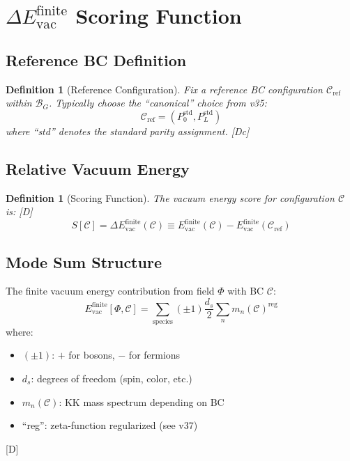 \documentclass[11pt,a4paper]{article}
\newtheorem{definition}[theorem]{Definition}
\newcommand{\tagD}{\textcolor{blue!70!black}{[D]}}
\newcommand{\tagDc}{\textcolor{blue!50!black}{[Dc]}}
\begin{document}
\section{$\Delta E_{\text{vac}}^{\text{finite}}$ Scoring Function}

\subsection{Reference BC Definition}

\begin{definition}[Reference Configuration]
\label{def:bc-ref}
Fix a reference BC configuration $\mathcal{C}_{\text{ref}}$ within $\mathcal{B}_G$.
Typically choose the ``canonical'' choice from v35:
\begin{equation}
\label{eq:bc-ref}
\mathcal{C}_{\text{ref}} = (P_0^{\text{std}}, P_L^{\text{std}})
\end{equation}
where ``std'' denotes the standard parity assignment. \tagDc
\end{definition}

\subsection{Relative Vacuum Energy}

\begin{definition}[Scoring Function]
\label{def:score}
The vacuum energy score for configuration $\mathcal{C}$ is: \tagD
\begin{equation}
\label{eq:score}
\boxed{S[\mathcal{C}] = \Delta E_{\text{vac}}^{\text{finite}}(\mathcal{C})
\equiv E_{\text{vac}}^{\text{finite}}(\mathcal{C}) - E_{\text{vac}}^{\text{finite}}(\mathcal{C}_{\text{ref}})}
\end{equation}
\end{definition}

\subsection{Mode Sum Structure}

\begin{scorebox}
The finite vacuum energy contribution from field $\Phi$ with BC $\mathcal{C}$:
\begin{equation}
\label{eq:mode-sum}
E_{\text{vac}}^{\text{finite}}[\Phi, \mathcal{C}] = \sum_{\text{species}} (\pm 1) \frac{d_s}{2}
\sum_n m_n(\mathcal{C})^{\text{reg}}
\end{equation}
where:
\begin{itemize}
    \item $(\pm 1)$: $+$ for bosons, $-$ for fermions
    \item $d_s$: degrees of freedom (spin, color, etc.)
    \item $m_n(\mathcal{C})$: KK mass spectrum depending on BC
    \item ``reg'': zeta-function regularized (see v37)
\end{itemize}
\tagD
\end{scorebox}
\end{document}
